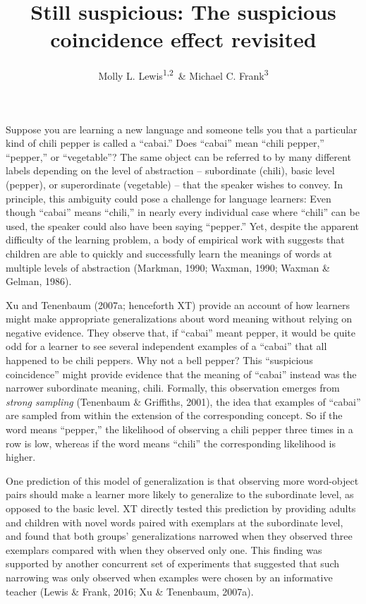 \documentclass[english,floatsintext,man]{apa6}
\title{Still suspicious: The suspicious coincidence effect revisited}
\author{Molly L. Lewis\textsuperscript{1,2}~\& Michael C. Frank\textsuperscript{3}}
\affiliation{
    \vspace{0.5cm}
          \textsuperscript{1} Computation Institute, University of Chicago\\
          \textsuperscript{2} Department of Psychology, University of Wisconsin, Madison\\
          \textsuperscript{3} Department of Psychology, Stanford University  }
\theoremstyle{definition}
\theoremstyle{definition}
\theoremstyle{remark}
\begin{document}
\maketitle

\setcounter{secnumdepth}{0}



Suppose you are learning a new language and someone tells you that a
particular kind of chili pepper is called a \enquote{cabai.} Does
\enquote{cabai} mean \enquote{chili pepper,} \enquote{pepper,} or
\enquote{vegetable}? The same object can be referred to by many
different labels depending on the level of abstraction -- subordinate
(chili), basic level (pepper), or superordinate (vegetable) -- that the
speaker wishes to convey. In principle, this ambiguity could pose a
challenge for language learners: Even though \enquote{cabai} means
\enquote{chili,} in nearly every individual case where \enquote{chili}
can be used, the speaker could also have been saying \enquote{pepper.}
Yet, despite the apparent difficulty of the learning problem, a body of
empirical work with suggests that children are able to quickly and
successfully learn the meanings of words at multiple levels of
abstraction (Markman, 1990; Waxman, 1990; Waxman \& Gelman, 1986).

Xu and Tenenbaum (2007a; henceforth XT) provide an account of how
learners might make appropriate generalizations about word meaning
without relying on negative evidence. They observe that, if
\enquote{cabai} meant pepper, it would be quite odd for a learner to see
several independent examples of a \enquote{cabai} that all happened to
be chili peppers. Why not a bell pepper? This \enquote{suspicious
coincidence} might provide evidence that the meaning of \enquote{cabai}
instead was the narrower subordinate meaning, chili. Formally, this
observation emerges from \emph{strong sampling} (Tenenbaum \& Griffiths,
2001), the idea that examples of \enquote{cabai} are sampled from within
the extension of the corresponding concept. So if the word means
\enquote{pepper,} the likelihood of observing a chili pepper three times
in a row is low, whereas if the word means \enquote{chili} the
corresponding likelihood is higher.

One prediction of this model of generalization is that observing more
word-object pairs should make a learner more likely to generalize to the
subordinate level, as opposed to the basic level. XT directly tested
this prediction by providing adults and children with novel words paired
with exemplars at the subordinate level, and found that both groups'
generalizations narrowed when they observed three exemplars compared
with when they observed only one. This finding was supported by another
concurrent set of experiments that suggested that such narrowing was
only observed when examples were chosen by an informative teacher (Lewis
\& Frank, 2016; Xu \& Tenenbaum, 2007a).
\end{document}
